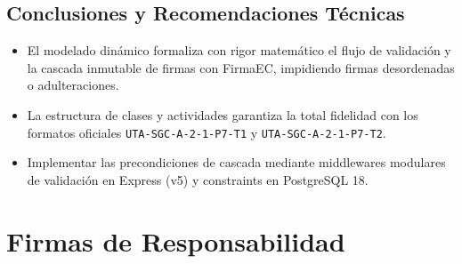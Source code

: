 \documentclass[12pt,a4paper]{article}
\begin{document}
\subsection{Conclusiones y Recomendaciones Técnicas}
\begin{itemize}[leftmargin=1.5em, itemsep=2pt]
    \item El modelado dinámico formaliza con rigor matemático el flujo de validación y la cascada inmutable de firmas con FirmaEC, impidiendo firmas desordenadas o adulteraciones.
    \item La estructura de clases y actividades garantiza la total fidelidad con los formatos oficiales \texttt{UTA-SGC-A-2-1-P7-T1} y \texttt{UTA-SGC-A-2-1-P7-T2}.
    \item Implementar las precondiciones de cascada mediante middlewares modulares de validación en Express (v5) y constraints en PostgreSQL 18.
\end{itemize}

\vspace{0.3cm}

\section{Firmas de Responsabilidad}
\end{document}
